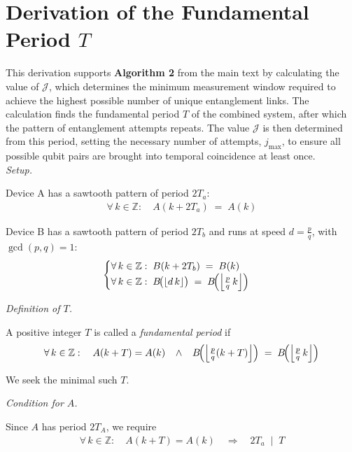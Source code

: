 \newpage
\section{Derivation of the Fundamental Period $T$}

This derivation supports \textbf{Algorithm 2} from the main text by calculating the value of $\mathcal{J}$, which determines the minimum measurement window required to achieve the highest possible number of unique entanglement links. The calculation finds the fundamental period $T$ of the combined system, after which the pattern of entanglement attempts repeats. The value $\mathcal{J}$ is then determined from this period, setting the necessary number of attempts, $j_{\text{max}}$, to ensure all possible qubit pairs are brought into temporal coincidence at least once.\\

\textit{Setup.}

Device A has a sawtooth pattern of period $2T_a$:
\begin{align}
  \forall\,k\in\mathbb{Z}
  :\quad A(k + 2T_a) \;=\; A(k)
\end{align}

Device B has a sawtooth pattern of period $2T_b$ and runs at speed $d = \tfrac{p}{q}$, with $\gcd(p,q) = 1$:
\begin{gather}
\begin{cases}
    \forall\,k \in \mathbb{Z}:\; B(k + 2T_b) \;=\; B(k)\\
    \forall\,k\in\mathbb{Z}:\; B\!\bigl(\lfloor d\,k\rfloor \bigr) \;=\;
    B\!\Bigl(\left\lfloor \tfrac{p}{q}\,k \right\rfloor\Bigr) 
\end{cases}
\end{gather}

\textit{Definition of $T$.}

A positive integer $T$ is called a \emph{fundamental period} if
\begin{align}
   \forall\,k \in \mathbb{Z}
   :\quad
   A(k+T) = A(k)
   \;\;\;\wedge\;\;\;
   B\!\Bigl(\left\lfloor \tfrac{p}{q}(k+T)\right\rfloor\Bigr)
   \;=\;
   B\!\Bigl(\left\lfloor \tfrac{p}{q}\,k\right\rfloor\Bigr)
   \label{eq:fundamentalperiod}
\end{align}

We seek the minimal such $T$.

\textit{Condition for $A$.}

Since $A$ has period $2T_A$, we require
\begin{align}
   \forall\,k\in \mathbb{Z}
   :\quad
   A(k+T) = A(k)
   \quad\Longrightarrow\quad
   2T_a \;\mid\; T
\end{align}

